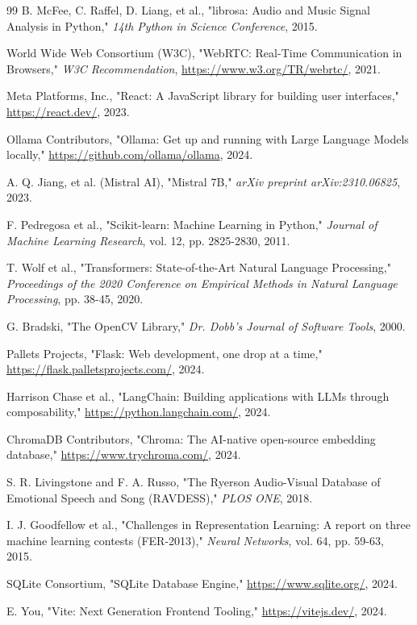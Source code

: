 \documentclass[11pt]{report}
\begin{document}
\begin{thebibliography}{99}
 B. McFee, C. Raffel, D. Liang, et al., "librosa: Audio and Music Signal Analysis in Python," \textit{14th Python in Science Conference}, 2015.

 World Wide Web Consortium (W3C), "WebRTC: Real-Time Communication in Browsers," \textit{W3C Recommendation}, \url{https://www.w3.org/TR/webrtc/}, 2021.

 Meta Platforms, Inc., "React: A JavaScript library for building user interfaces," \url{https://react.dev/}, 2023.

 Ollama Contributors, "Ollama: Get up and running with Large Language Models locally," \url{https://github.com/ollama/ollama}, 2024.

 A. Q. Jiang, et al. (Mistral AI), "Mistral 7B," \textit{arXiv preprint arXiv:2310.06825}, 2023.

 F. Pedregosa et al., "Scikit-learn: Machine Learning in Python," \textit{Journal of Machine Learning Research}, vol. 12, pp. 2825-2830, 2011.

 T. Wolf et al., "Transformers: State-of-the-Art Natural Language Processing," \textit{Proceedings of the 2020 Conference on Empirical Methods in Natural Language Processing}, pp. 38-45, 2020.

 G. Bradski, "The OpenCV Library," \textit{Dr. Dobb's Journal of Software Tools}, 2000.

 Pallets Projects, "Flask: Web development, one drop at a time," \url{https://flask.palletsprojects.com/}, 2024.

 Harrison Chase et al., "LangChain: Building applications with LLMs through composability," \url{https://python.langchain.com/}, 2024.

 ChromaDB Contributors, "Chroma: The AI-native open-source embedding database," \url{https://www.trychroma.com/}, 2024.

 S. R. Livingstone and F. A. Russo, "The Ryerson Audio-Visual Database of Emotional Speech and Song (RAVDESS)," \textit{PLOS ONE}, 2018.

 I. J. Goodfellow et al., "Challenges in Representation Learning: A report on three machine learning contests (FER-2013)," \textit{Neural Networks}, vol. 64, pp. 59-63, 2015.

 SQLite Consortium, "SQLite Database Engine," \url{https://www.sqlite.org/}, 2024.

 E. You, "Vite: Next Generation Frontend Tooling," \url{https://vitejs.dev/}, 2024.

\end{thebibliography}
\end{document}
